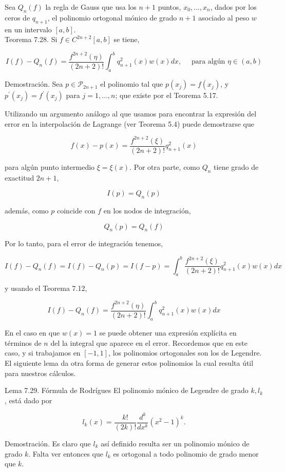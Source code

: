 \documentclass[10pt]{article}
\begin{document}
Sea $Q_{n}(f)$ la regla de Gauss que usa los $n+1$ puntos, $x_{0}, \ldots, x_{n}$, dados por los ceros de $q_{n+1}$, el polinomio ortogonal mónico de grado $n+1$ asociado al peso $w$ en un intervalo $[a, b]$.\\
Teorema 7.28. Si $f \in C^{2 n+2}[a, b]$ se tiene,

$$
I(f)-Q_{n}(f)=\frac{f^{2 n+2}(\eta)}{(2 n+2)!} \int_{a}^{b} q_{n+1}^{2}(x) w(x) d x, \quad \text { para algún } \eta \in(a, b)
$$

Demostración. Sea $p \in \mathcal{P}_{2 n+1}$ el polinomio tal que $p\left(x_{j}\right)=f\left(x_{j}\right)$, y $p^{\prime}\left(x_{j}\right)=f^{\prime}\left(x_{j}\right)$ para $j=1, \ldots, n$; que existe por el Teorema 5.17.

Utilizando un argumento análogo al que usamos para encontrar la expresión del error en la interpolación de Lagrange (ver Teorema 5.4) puede demostrarse que

$$
f(x)-p(x)=\frac{f^{2 n+2}(\xi)}{(2 n+2)!} q_{n+1}^{2}(x)
$$

para algún punto intermedio $\xi=\xi(x)$. Por otra parte, como $Q_{n}$ tiene grado de exactitud $2 n+1$,

$$
I(p)=Q_{n}(p)
$$

además, como $p$ coincide con $f$ en los nodos de integración,

$$
Q_{n}(p)=Q_{n}(f)
$$

Por lo tanto, para el error de integración tenemos,

$$
I(f)-Q_{n}(f)=I(f)-Q_{n}(p)=I(f-p)=\int_{a}^{b} \frac{f^{2 n+2}(\xi)}{(2 n+2)!} q_{n+1}^{2}(x) w(x) d x
$$

y usando el Teorema 7.12,

$$
I(f)-Q_{n}(f)=\frac{f^{2 n+2}(\eta)}{(2 n+2)!} \int_{a}^{b} q_{n+1}^{2}(x) w(x) d x
$$

En el caso en que $w(x)=1$ se puede obtener una expresión explícita en términos de $n$ del la integral que aparece en el error. Recordemos que en este caso, y si trabajamos en $[-1,1]$, los polinomios ortogonales son los de Legendre. El siguiente lema da otra forma de generar estos polinomios la cual resulta útil para nuestros cálculos.

Lema 7.29. Fórmula de Rodrígues El polinomio mónico de Legendre de grado $k, l_{k}$, está dado por

$$
l_{k}(x)=\frac{k!}{(2 k)!} \frac{d^{k}}{d x^{k}}\left(x^{2}-1\right)^{k} .
$$

Demostración. Es claro que $l_{k}$ así definido resulta ser un polinomio mónico de grado $k$. Falta ver entonces que $l_{k}$ es ortogonal a todo polinomio de grado menor que $k$.
\end{document}
